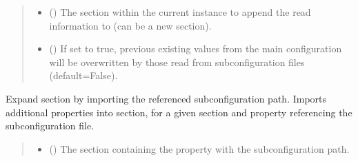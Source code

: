 \documentclass[letterpaper,10pt,english]{sphinxmanual}
\begin{document}
\begin{fulllineitems}
\begin{fulllineitems}
\begin{quote}
\begin{description}
\begin{itemize}
\item {} 
\sphinxAtStartPar
{} () \textendash{} The section within the current instance to append
the read information to (can be a new section).

\item {} 
\sphinxAtStartPar
{} () \textendash{} If set to true, previous existing values from
the main configuration will be overwritten by those read from
sub\sphinxhyphen{}configuration files (default=False).

\end{itemize}

\end{description}\end{quote}

\end{fulllineitems}


\begin{fulllineitems}
\label{\detokenize{modules/input/config_handler:qnav.input.config_handler.ConfigHandler.expand_section}}
\pysigstartsignatures
{}
\pysigstopsignatures
\sphinxAtStartPar
Expand section by importing the referenced sub\sphinxhyphen{}configuration path.
Imports additional properties into section, for a given section and
property referencing the sub\sphinxhyphen{}configuration file.
\begin{quote}\begin{description}
\begin{itemize}
\item {} 
\sphinxAtStartPar
{} () \textendash{} The section containing the property with the
sub\sphinxhyphen{}configuration path.


\end{itemize}
\end{description}
\end{quote}
\end{fulllineitems}
\end{fulllineitems}
\end{document}
